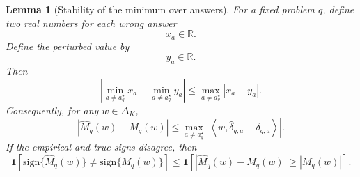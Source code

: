 \documentclass{article} %
\newtheorem{lemma}[theorem]{Lemma}
\providecommand{\simplex}{\Delta_K}
\providecommand{\Mhat}{\widehat{M}}
\begin{document}
\begin{lemma}[Stability of the minimum over answers]
\label{lem:4}
For a fixed problem \(q\), define two real numbers for each wrong answer
\begin{equation}
\label{eq:app4-xa}
x_a \in \mathbb{R}.
\end{equation}
Define the perturbed value by
\begin{equation}
\label{eq:app4-ya}
y_a \in \mathbb{R}.
\end{equation}
Then
\begin{equation}
\label{eq:app4-min-stability}
\left|
\min_{a\ne a_q^\star}x_a
-
\min_{a\ne a_q^\star}y_a
\right|
\le
\max_{a\ne a_q^\star}|x_a-y_a|.
\end{equation}
Consequently, for any \(w\in\simplex\),
\begin{equation}
\label{eq:app4-margin-stability}
\left|
\Mhat_q(w)-M_q(w)
\right|
\le
\max_{a\ne a_q^\star}
\left|
\left\langle
w,\widehat{\delta}_{q,a}-\delta_{q,a}
\right\rangle
\right|.
\end{equation}
If the empirical and true signs disagree, then
\begin{equation}
\label{eq:app4-sign-implies-error}
\mathbf 1\!\left[
\mathrm{sign}\{\Mhat_q(w)\}
\ne
\mathrm{sign}\{M_q(w)\}
\right]
\le
\mathbf 1\!\left[
\left|\Mhat_q(w)-M_q(w)\right|
\ge
|M_q(w)|
\right].
\end{equation}
\end{lemma}
\end{document}
